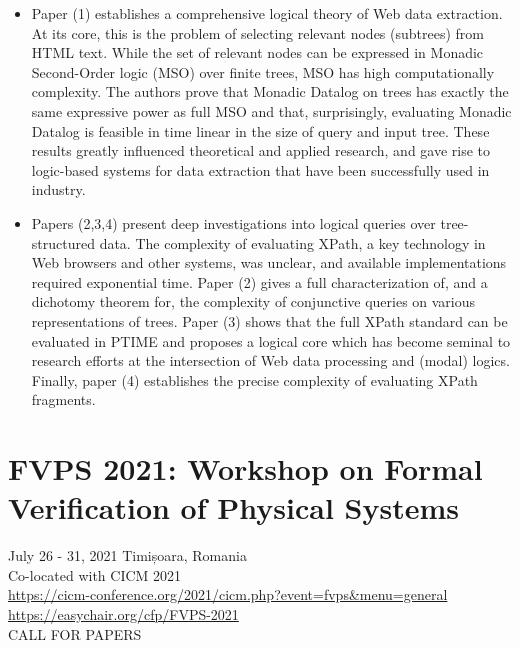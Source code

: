 \documentclass[prodmode,acmtecs]{acmsmall} %
\begin{document}
\begin{itemize}
\begin{itemize}\item  Paper (1) establishes a comprehensive logical theory of Web data extraction. At its core, this is the problem of selecting relevant nodes (subtrees) from HTML text. While the set of relevant nodes can be expressed in Monadic Second-Order logic (MSO) over ﬁnite trees, MSO has high computationally complexity. The authors prove that Monadic Datalog on trees has exactly the same expressive power as full MSO and that, surprisingly, evaluating Monadic Datalog is feasible in time linear in the size of query and input tree. These results greatly inﬂuenced theoretical and applied research, and gave rise to logic-based systems for data extraction that have been successfully used in industry.
\item  Papers (2,3,4) present deep investigations into logical queries over tree-structured data. The complexity of evaluating XPath, a key technology in Web browsers and other systems, was unclear, and available implementations required exponential time. Paper (2) gives a full characterization of, and a dichotomy theorem for, the complexity of conjunctive queries on various representations of trees. Paper (3) shows that the full XPath standard can be evaluated in PTIME and proposes a logical core which has become seminal to research eﬀorts at the intersection of Web data processing and (modal) logics. Finally, paper (4) establishes the precise complexity of evaluating XPath fragments.
\end{itemize} 
\end{itemize}\section{FVPS 2021: Workshop on Formal Verification of Physical Systems}\label{FVPS2021}  July 26 - 31, 2021  Timișoara, Romania\\ 
  Co-located with CICM 2021\\ 
  \href{https://cicm-conference.org/2021/cicm.php?event=fvps\&menu=general}{https://cicm-conference.org/2021/cicm.php?event=fvps\&menu=general}\\ 
  \href{https://easychair.org/cfp/FVPS-2021}{https://easychair.org/cfp/FVPS-2021}\\ 
CALL FOR PAPERS 
\end{document}

